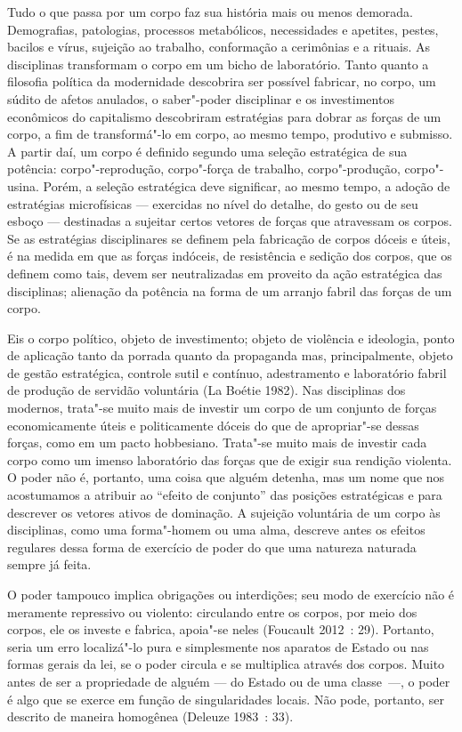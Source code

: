 Tudo o que passa por um
corpo faz sua história mais ou menos demorada. Demografias, patologias,
processos metabólicos, necessidades e apetites, pestes, bacilos e vírus,
sujeição ao trabalho, conformação a cerimônias e a rituais. As
disciplinas transformam o corpo em um bicho de laboratório. Tanto quanto
a filosofia política da modernidade descobrira ser possível fabricar, no
corpo, um súdito de afetos anulados, o saber"-poder disciplinar e os
investimentos econômicos do capitalismo descobriram estratégias para
dobrar as forças de um corpo, a fim de transformá"-lo em corpo, ao mesmo
tempo, produtivo e submisso. A partir daí, um corpo é definido segundo
uma seleção estratégica de sua potência: corpo"-reprodução, corpo"-força
de trabalho, corpo"-produção, corpo"-usina. Porém, a seleção estratégica
deve significar, ao mesmo tempo, a adoção de estratégias microfísicas ---
exercidas no nível do detalhe, do gesto ou de seu esboço --- destinadas a
sujeitar certos vetores de forças que atravessam os corpos. Se as
estratégias disciplinares se definem pela fabricação de corpos dóceis e
úteis, é na medida em que as forças indóceis, de resistência e sedição
dos corpos, que os definem como tais, devem ser neutralizadas em
proveito da ação estratégica das disciplinas; alienação da potência na
forma de um arranjo fabril das forças de um corpo.

Eis o corpo político, objeto de investimento; objeto de violência e
ideologia, ponto de aplicação tanto da porrada quanto da propaganda mas,
principalmente, objeto de gestão estratégica, controle sutil e contínuo,
adestramento e laboratório fabril de produção de servidão voluntária (La
Boétie 1982). Nas disciplinas dos modernos, trata"-se muito mais de
investir um corpo de um conjunto de forças economicamente úteis e
politicamente dóceis do que de apropriar"-se dessas forças, como em um
pacto hobbesiano. Trata"-se muito mais de investir cada corpo como um
imenso laboratório das forças que de exigir sua rendição violenta. O
poder não é, portanto, uma coisa que alguém detenha, mas um nome que nos
acostumamos a atribuir ao ``efeito de conjunto'' das posições
estratégicas e para descrever os vetores ativos de dominação. A sujeição
voluntária de um corpo às disciplinas, como uma forma"-homem ou uma alma,
descreve antes os efeitos regulares dessa forma de exercício de poder do
que uma natureza naturada sempre já feita.

O poder tampouco implica obrigações ou interdições; seu modo de
exercício não é meramente repressivo ou violento: circulando entre os
corpos, por meio dos corpos, ele os investe e fabrica, apoia"-se neles
(Foucault 2012~: 29). Portanto, seria um erro localizá"-lo pura e
simplesmente nos aparatos de Estado ou nas formas gerais da lei, se o
poder circula e se multiplica através dos corpos. Muito antes de ser a
propriedade de alguém --- do Estado ou de uma classe~---, o poder é algo
que se exerce em função de singularidades locais. Não pode, portanto,
ser descrito de maneira homogênea (Deleuze 1983~: 33).

